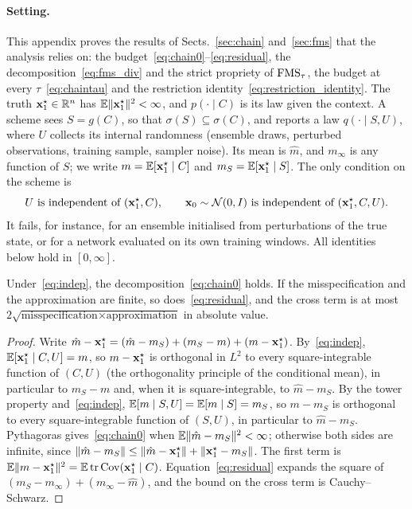 \paragraph{Setting.}
This appendix proves the results of Sects.~\ref{sec:chain} and~\ref{sec:fms} that the analysis relies on: the
budget~\eqref{eq:chain0}--\eqref{eq:residual}, the decomposition~\eqref{eq:fms_div} and the strict propriety of
$\mathrm{FMS}_\tau$, the budget at every $\tau$~\eqref{eq:chaintau} and the restriction
identity~\eqref{eq:restriction_identity}. The truth $\mathbf{x}_1^\star \in \mathbb{R}^n$ has
$\mathbb{E}\|\mathbf{x}_1^\star\|^2 < \infty$, and $p(\cdot \mid C)$ is its law given the context. A scheme sees $S = g(C)$, so
that $\sigma(S) \subseteq \sigma(C)$, and reports a law $q(\cdot \mid S, U)$, where $U$ collects its internal
randomness (ensemble draws, perturbed observations, training sample, sampler noise). Its mean is $\hat m$, and
$m_\infty$ is any function of $S$; we write $m = \mathbb{E}[\mathbf{x}_1^\star \mid C]$ and $m_S = \mathbb{E}[\mathbf{x}_1^\star \mid S]$. The only
condition on the scheme is
\begin{equation}\label{eq:indep}
  U \text{ is independent of } (\mathbf{x}_1^\star, C), \qquad
  \mathbf{x}_0 \sim \mathcal{N}(0, I) \text{ is independent of } (\mathbf{x}_1^\star, C, U).
\end{equation}
It fails, for instance, for an ensemble initialised from perturbations of the true state, or for a network
evaluated on its own training windows. All identities below hold in $[0, \infty]$.

\begin{proposition}\label{prop:budget}
Under~\eqref{eq:indep}, the decomposition~\eqref{eq:chain0} holds. If the misspecification and the approximation
are finite, so does~\eqref{eq:residual}, and the cross term is at most
$2\sqrt{\text{misspecification} \times \text{approximation}}$ in absolute value.
\end{proposition}
\begin{proof}
Write $\hat m - \mathbf{x}_1^\star = (\hat m - m_S) + (m_S - m) + (m - \mathbf{x}_1^\star)$. By~\eqref{eq:indep},
$\mathbb{E}[\mathbf{x}_1^\star \mid C, U] = m$, so $m - \mathbf{x}_1^\star$ is orthogonal in $L^2$ to every square-integrable function of
$(C, U)$ (the orthogonality principle of the conditional mean), in particular to $m_S - m$ and, when it is
square-integrable, to $\hat m - m_S$. By the tower property and~\eqref{eq:indep},
$\mathbb{E}[m \mid S, U] = \mathbb{E}[m \mid S] = m_S$, so $m - m_S$ is orthogonal to every square-integrable function of
$(S, U)$, in particular to $\hat m - m_S$. Pythagoras gives~\eqref{eq:chain0} when $\mathbb{E}\|\hat m - m_S\|^2 < \infty$;
otherwise both sides are infinite, since $\|\hat m - m_S\| \le \|\hat m - \mathbf{x}_1^\star\| + \|\mathbf{x}_1^\star - m_S\|$. The
first term is $\mathbb{E}\|m - \mathbf{x}_1^\star\|^2 = \mathbb{E}\operatorname{tr}\operatorname{Cov}(\mathbf{x}_1^\star \mid C)$. Equation~\eqref{eq:residual} expands the
square of $(m_S - m_\infty) + (m_\infty - \hat m)$, and the bound on the cross term is Cauchy--Schwarz.
\end{proof}


